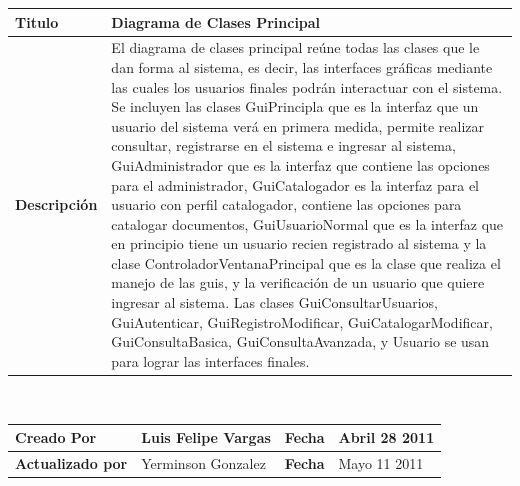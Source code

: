 	\begin{tabular}{|p{5cm}|p{11cm}|}\hline
	{\bf Titulo} & {Diagrama de Clases Principal}\\
	\hline
	{\bf Descripción} & {El diagrama de clases principal reúne todas las clases que le
	dan forma al sistema, es decir, las interfaces gráficas mediante las cuales los
	usuarios finales podrán interactuar con el sistema.\newline
	Se incluyen las clases GuiPrincipla que es la interfaz que un usuario del sistema
	verá en primera medida, permite realizar consultar, registrarse en el sistema e ingresar al
	sistema, GuiAdministrador que es la interfaz que contiene las opciones para el administrador,
	GuiCatalogador es la interfaz para el usuario con perfil catalogador, contiene las opciones 
	para catalogar documentos, GuiUsuarioNormal que es la interfaz que en principio tiene un 
	usuario recien registrado al sistema y la clase ControladorVentanaPrincipal que es la clase
	que realiza el manejo de las guis, y la verificación de un usuario que quiere ingresar al
	sistema.\newline
	Las clases GuiConsultarUsuarios, GuiAutenticar, GuiRegistroModificar, GuiCatalogarModificar,
	GuiConsultaBasica, GuiConsultaAvanzada, y Usuario se usan para lograr las interfaces 
	finales.}\\
	\hline
	\end{tabular}\\[.5cm]
				
	\begin{tabular}{|p{3.5cm}|p{4.5cm}|p{2.5cm}|p{4.5cm}|}\hline
	{\bf Creado Por} & {Luis Felipe Vargas} & {\bf Fecha} & {Abril 28 2011}\\
	\hline
	{\bf Actualizado por} & {Yerminson Gonzalez} & {\bf Fecha} & {Mayo 11 2011}\\
	\hline
	\end{tabular}
	
